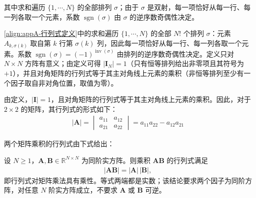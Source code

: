 \documentclass[../main.tex]{subfiles}
\begin{document}
其中求和遍历 $\{1,\cdots,N\}$ 的全部排列 $\sigma$；由于 $\sigma$ 是双射，每一项恰好从每一行、每一列各取一个元素，系数 $\operatorname{sgn}(\sigma)$ 由 $\sigma$ 的逆序数奇偶性决定。

\begin{remark}
\eqref{align:appA-行列式定义}中的求和遍历 $\{1,\cdots,N\}$ 的全部 $N!$ 个排列 $\sigma$：元素 $A_{k,\sigma(k)}$ 取自第 $k$ 行第 $\sigma(k)$ 列，因此每一项恰好从每一行、每一列各取一个元素。系数 $\operatorname{sgn}(\sigma)=(-1)^{\operatorname{inv}(\sigma)}$ 由排列的逆序数奇偶性决定。定义只对 $N\times N$ 方阵有意义；由定义可得 $|\bm{I}_{N}|=1$（只有恒等排列给出非零项且其符号为 $+1$），并且对角矩阵的行列式等于其主对角线上元素的乘积（非恒等排列至少有一个因子取自非对角位置，取值为零）。
\end{remark}

由定义，$|\bm{I}|=1$，且对角矩阵的行列式等于其主对角线上元素的乘积。因此，对于 $2\times2$ 的矩阵，其行列式的形式如下：
\begin{align}
  |\bm{A}|=\begin{vmatrix}a_{11}&a_{12}\\a_{21}&a_{22}\end{vmatrix}=a_{11}a_{22}-a_{12}a_{21}
  \label{align:appA-二阶行列式}
\end{align}

两个矩阵乘积的行列式由下式给出：
\begin{proposition}[乘积的行列式]\label{proposition:appA-乘积的行列式}
设 $N\geqslant1$，$\bm{A},\bm{B}\in\mathbb{R}^{N\times N}$ 为同阶实方阵。则乘积 $\bm{A}\bm{B}$ 的行列式满足
\begin{align}
  |\bm{A}\bm{B}|=|\bm{A}|\,|\bm{B}|,
  \label{align:appA-行列式乘积}
\end{align}
即行列式对矩阵乘法具有乘性。等式两端都是实数；该结论要求两个因子为同阶方阵，对任意 $N$ 阶实方阵成立，不要求 $\bm{A}$ 或 $\bm{B}$ 可逆。
\end{proposition}
\end{document}
